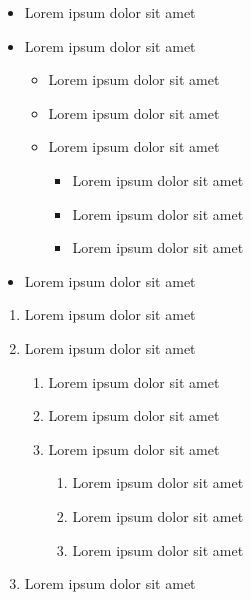 \documentclass[12pt]{scrreprt}
\begin{document}
\begin{itemize}
	\item Lorem ipsum dolor sit amet
	\item Lorem ipsum dolor sit amet
	\begin{itemize}
		\item Lorem ipsum dolor sit amet
		\item Lorem ipsum dolor sit amet
		\item Lorem ipsum dolor sit amet
		\begin{itemize}
			\item Lorem ipsum dolor sit amet
			\item Lorem ipsum dolor sit amet
			\item Lorem ipsum dolor sit amet
		\end{itemize}
	\end{itemize}
	\item Lorem ipsum dolor sit amet
\end{itemize}

\begin{enumerate}
	\item Lorem ipsum dolor sit amet
	\item Lorem ipsum dolor sit amet
	\begin{enumerate}
		\item Lorem ipsum dolor sit amet
		\item Lorem ipsum dolor sit amet
		\item Lorem ipsum dolor sit amet
		\begin{enumerate}
			\item Lorem ipsum dolor sit amet
			\item Lorem ipsum dolor sit amet
			\item Lorem ipsum dolor sit amet
		\end{enumerate}
	\end{enumerate}
	\item Lorem ipsum dolor sit amet
\end{enumerate}

\printbibliography
\end{document}
